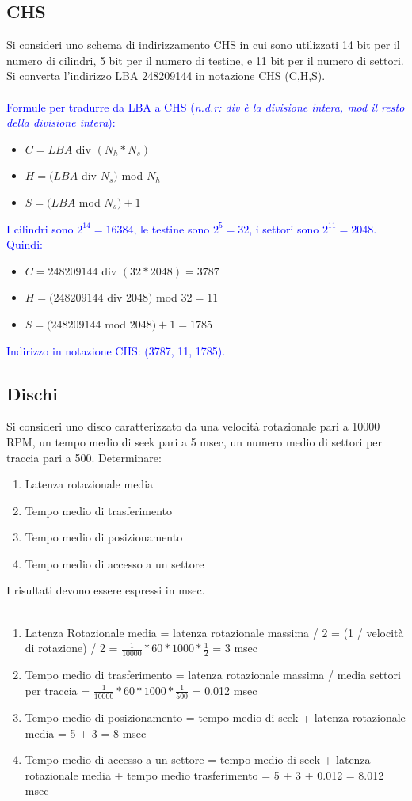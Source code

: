 \documentclass[12pt]{article}
\begin{document}
\subsection{CHS}
Si consideri uno schema di indirizzamento CHS in cui sono utilizzati 14 bit per il numero di
cilindri, 5 bit per il numero di testine, e 11 bit per il numero di settori.
Si converta l'indirizzo LBA 248209144 in notazione CHS (C,H,S).\\\\
\textcolor{blue}{Formule per tradurre da LBA a CHS (\textit{n.d.r: div è la divisione intera, mod il resto della divisione intera}):}
\begin{itemize}
    \color{blue}
    \item $C = LBA$ div $(N_h * N_s)$
    \item $H = (LBA$ div $N_s)$ mod $N_h$
    \item $S = (LBA$ mod $N_s) + 1$
\end{itemize}
\textcolor{blue}{I cilindri sono $2^{14} = 16384$, le testine sono $2^5 = 32$, i settori sono $2^{11} = 2048$. Quindi:}
\begin{itemize}
    \color{blue}
    \item $C = 248209144$ div $(32 * 2048) = 3787$
    \item $H = (248209144$ div $2048)$ mod $32 = 11$
    \item $S = (248209144$ mod $2048) + 1 = 1785$
\end{itemize}
\textcolor{blue}{Indirizzo in notazione CHS: (3787, 11, 1785).}
\subsection{Dischi}
Si consideri uno disco caratterizzato da una velocità rotazionale pari a 10000 RPM, un tempo medio
di seek pari a 5 msec, un numero medio di settori per traccia pari a 500.
Determinare:
\begin{enumerate}
    \item Latenza rotazionale media
    \item Tempo medio di trasferimento
    \item Tempo medio di posizionamento
    \item Tempo medio di accesso a un settore
\end{enumerate}
I risultati devono essere espressi in msec.\\\\
\begin{enumerate}
    \color{blue}
    \item Latenza Rotazionale media = latenza rotazionale massima / 2 = (1 / velocità di rotazione) / 2 = $\frac{1}{10000} * 60 * 1000 * \frac{1}{2}$ = 3 msec
    \item Tempo medio di trasferimento = latenza rotazionale massima / media settori per traccia = $\frac{1}{10000} * 60 * 1000 * \frac{1}{500}$ = 0.012 msec
    \item Tempo medio di posizionamento = tempo medio di seek + latenza rotazionale media = 5 + 3 = 8 msec
    \item Tempo medio di accesso a un settore = tempo medio di seek + latenza rotazionale media + tempo medio trasferimento = 5 + 3 + 0.012 = 8.012 msec
\end{enumerate}
\end{document}

